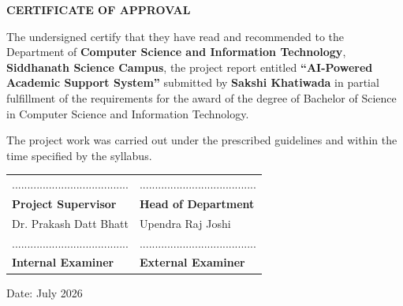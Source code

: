 \thispagestyle{plain}

\UniversityHeader
\begin{center}
    {\Large\bfseries CERTIFICATE OF APPROVAL}
\end{center}

\vspace{0.15cm}

The undersigned certify that they have read and recommended to the Department
of \textbf{Computer Science and Information Technology},
\textbf{Siddhanath Science Campus}, the project report entitled
\textbf{``AI-Powered Academic Support System''}
submitted by
\textbf{Sakshi Khatiwada}
in partial fulfillment of the requirements for the award of the degree of
Bachelor of Science in Computer Science and Information Technology.

\vspace{0.25cm}

The project work was carried out under the prescribed guidelines and within
the time specified by the syllabus.

\vspace{1cm}

\renewcommand{\arraystretch}{2}

\begin{tabularx}{\textwidth}{X X}
...................................... &
...................................... \\

\textbf{Project Supervisor} &
\textbf{Head of Department} \\

Dr. Prakash Datt Bhatt &
Upendra Raj Joshi \\[1cm]

...................................... &
...................................... \\

\textbf{Internal Examiner} &
\textbf{External Examiner}
\end{tabularx}

\vfill

Date: July 2026